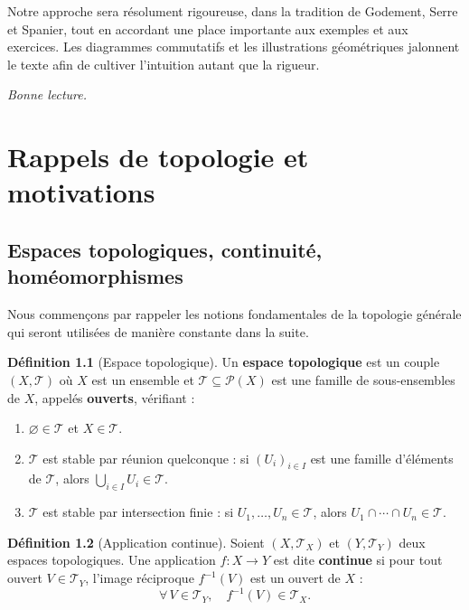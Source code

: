 \documentclass[12pt,a4paper,openany]{book}
\theoremstyle{definition}
\newtheorem{definition}{Définition}[chapter]
\theoremstyle{plain}
\theoremstyle{remark}
\begin{document}
Notre approche sera résolument rigoureuse, dans la tradition de Godement, Serre
et Spanier, tout en accordant une place importante aux exemples et aux exercices.
Les diagrammes commutatifs et les illustrations géométriques jalonnent le texte
afin de cultiver l'intuition autant que la rigueur.

\bigskip
\hfill \emph{Bonne lecture.}

\chapter{Rappels de topologie et motivations}\label{chap:rappels}

\section{Espaces topologiques, continuité, homéomorphismes}\label{sec:espaces-top}

Nous commençons par rappeler les notions fondamentales de la topologie générale
qui seront utilisées de manière constante dans la suite.

\begin{definition}[Espace topologique]\label{def:espace-top}
Un \textbf{espace topologique} est un couple $(X, \mathcal{T})$ où $X$ est un
ensemble et $\mathcal{T} \subseteq \mathcal{P}(X)$ est une famille de
sous-ensembles de $X$, appelés \textbf{ouverts}, vérifiant :
\begin{enumerate}[label=(\roman*)]
\item $\varnothing \in \mathcal{T}$ et $X \in \mathcal{T}$.
\item $\mathcal{T}$ est stable par réunion quelconque : si $(U_i)_{i \in I}$ est
une famille d'éléments de $\mathcal{T}$, alors $\bigcup_{i \in I} U_i \in
\mathcal{T}$.
\item $\mathcal{T}$ est stable par intersection finie : si $U_1, \ldots, U_n \in
\mathcal{T}$, alors $U_1 \cap \cdots \cap U_n \in \mathcal{T}$.
\end{enumerate}
\end{definition}

\begin{definition}[Application continue]\label{def:continuite}
Soient $(X, \mathcal{T}_X)$ et $(Y, \mathcal{T}_Y)$ deux espaces topologiques.
Une application $f : X \to Y$ est dite \textbf{continue} si pour tout ouvert
$V \in \mathcal{T}_Y$, l'image réciproque $f^{-1}(V)$ est un ouvert de $X$ :
\[
\forall\, V \in \mathcal{T}_Y, \quad f^{-1}(V) \in \mathcal{T}_X.
\]
\end{definition}
\end{document}
